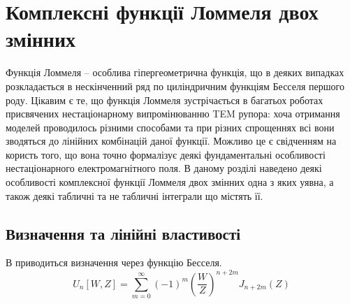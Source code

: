 \chapter{Комплексні функції Ломмеля двох змінних}
\label{ch:lommel}

Функція Ломмеля -- особлива гіпергеометрична функція, що в деяких випадках 
розкладається в нескінченний ряд по циліндричним функціям Бесселя першого роду.
Цікавим є те, що функція Ломмеля зустрічається в багатьох роботах присвячених
нестаціонарному випромінюванню TEM рупора: хоча отримання моделей проводилось 
різними способами та при різних спрощеннях всі вони зводяться до лінійних 
комбінацій даної функції. Можливо це є свідченням на користь того, що вона 
точно формалізує деякі фундаментальні особливості нестаціонарного 
електромагнітного поля. В даному розділі наведено деякі особливості 
комплексної функції Ломмеля двох змінних одна з яких уявна, а також деякі 
табличні та не табличні інтеграли що містять її. 

\section{Визначення та лінійні властивості}

В \cite{imp:Boersma1961} приводиться визначення через функцію Бесселя.
%
\begin{equation}
U_n \left[ W, Z \right] = \sum \limits_{m = 0}^{\infty} (-1)^m
\left( \frac{W}{Z} \right)^{n + 2m} J_{n + 2m} (Z)
\end{equation}

